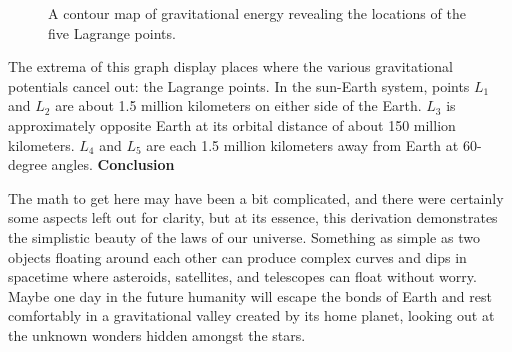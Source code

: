 \begin{figure}[h]
  \caption{A contour map of gravitational energy revealing the locations of the five Lagrange points.}
  \label{fig:3}
\end{figure}

The extrema of this graph display places where the various gravitational potentials cancel out: the Lagrange points. In the sun-Earth system, points $L_1$ and $L_2$ are about 1.5 million kilometers on either side of the Earth. $L_3$ is approximately opposite Earth at its orbital distance of about 150 million kilometers. $L_4$ and $L_5$ are each 1.5 million kilometers away from Earth at 60-degree angles.
\newline\newline
\textbf{Conclusion}
\newline

The math to get here may have been a bit complicated, and there were certainly some aspects left out for clarity, but at its essence, this derivation demonstrates the simplistic beauty of the laws of our universe. Something as simple as two objects floating around each other can produce complex curves and dips in spacetime where asteroids, satellites, and telescopes can float without worry. Maybe one day in the future humanity will escape the bonds of Earth and rest comfortably in a gravitational valley created by its home planet, looking out at the unknown wonders hidden amongst the stars. 